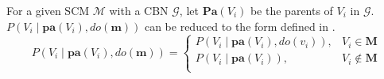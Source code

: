 \begin{lemma}\label{lemma:decompose-fault}
	For a given SCM $\mathcal{M}$ with a CBN $\mathcal{G}$, let $\mathbf{Pa}(V_{i})$ be the parents of $V_{i}$ in $\mathcal{G}$.
	$P(V_{i} \mid \mathbf{pa}(V_{i}), do(\mathbf{m}))$ can be reduced to the form defined in .
	\begin{equation}\label{eqn:parent-block-fault}
		P(V_{i} \mid \mathbf{pa}(V_{i}), do(\mathbf{m})) = \left\{\begin{array}{ll}
			P(V_{i} \mid \mathbf{pa}(V_{i}), do(v_{i})), & V_{i} \in \mathbf{M} \\
			P(V_{i} \mid \mathbf{pa}(V_{i})), & V_{i} \notin \mathbf{M} \\
		\end{array}\right.
	\end{equation}
\end{lemma}
